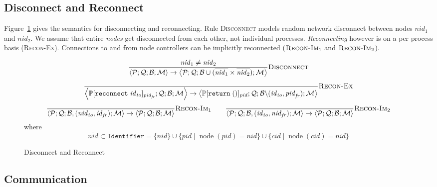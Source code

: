 \documentclass{article}
\newcommand{\sReturn}{\mathtt{return}}
\newcommand{\sReconnect}{\mathtt{reconnect}}
\DeclareMathOperator{\sNodeOf}{node}
\newcommand{\sNid}{\ensuremath{\mathit{nid}}}
\newcommand{\sPid}{\ensuremath{\mathit{pid}}}
\newcommand{\sCid}{\ensuremath{\mathit{cid}}}
\newcommand{\sId}{\ensuremath{\mathit{id}}}
\newcommand{\sSystem}[4]{\left\langle #1 ; #2 ; #3 ; #4 \right\rangle}
\newcommand{\sQueue}{\mathcal{Q}}
\newcommand{\sProcesses}{\mathcal{P}}
\newcommand{\sBlacklist}{\mathcal{B}}
\newcommand{\sMonitors}{\mathcal{M}}
\newcommand{\sCtxt}[1]{\mathbb{#1}}
\newcommand{\where}{\mathrel{|}}
\begin{document}
\subsection{Disconnect and Reconnect}

Figure~\ref{fig:disconnect} gives the semantics for disconnecting and
reconnecting.  Rule \textsc{Disconnect} models random network disconnect
between nodes $\sNid_1$ and $\sNid_2$.  We assume that entire \emph{nodes} get
disconnected from each other, not individual processes. \emph{Reconnecting}
however is on a per process basis (\textsc{Recon-Ex}).  Connections to and from
node controllers can be implicitly reconnected ($\textsc{Recon-Im}_1$ and
$\textsc{Recon-Im}_2$).

\begin{figure}
\small
\begin{equation*}
\frac{
  \sNid_1 \neq \sNid_2
}{
  \sSystem{\sProcesses}{\sQueue}{\sBlacklist}{\sMonitors}
\rightarrow
  \sSystem{\sProcesses}{\sQueue}{\sBlacklist \cup (\overline{\sNid_1} \times \overline{\sNid_2})}{\sMonitors}
} \textsc{Disconnect}
\end{equation*}
%
\begin{equation*}
\frac{
}{
  \sSystem{\sCtxt{P}[ \sReconnect \; \sId_\mathit{to} ]_{\sPid_\mathit{fr}}}
          {\sQueue}
          {\sBlacklist}
          {\sMonitors}
\rightarrow
  \sSystem{\sCtxt{P}[ \sReturn \; () ]_\sPid}
          {\sQueue}
          {\sBlacklist \backslash (\sId_\mathit{to}, \sPid_\mathit{fr})}
          {\sMonitors}
} \textsc{Recon-Ex}
\end{equation*}
%
\begin{equation*}
\frac{
}{
  \sSystem{\sProcesses}{\sQueue}{\sBlacklist, (\sNid_\mathit{to}, \sId_\mathit{fr})}{\sMonitors}
\rightarrow
  \sSystem{\sProcesses}{\sQueue}{\sBlacklist}{\sMonitors}
} \textsc{Recon-Im}_1
\qquad
\frac{
}{
  \sSystem{\sProcesses}{\sQueue}{\sBlacklist, (\sId_\mathit{to}, \sNid_\mathit{fr})}{\sMonitors}
\rightarrow
  \sSystem{\sProcesses}{\sQueue}{\sBlacklist}{\sMonitors}
} \textsc{Recon-Im}_2
\end{equation*}
%
where
%
\begin{equation*}
\overline{\sNid} \subset \mathtt{Identifier} 
  = \{ \sNid \} \cup 
    \{ \sPid \where \sNodeOf(\sPid) = \sNid \} \cup
    \{ \sCid \where \sNodeOf(\sCid) = \sNid \} 
\end{equation*}
\caption{\label{fig:disconnect}Disconnect and Reconnect}
\end{figure}

\subsection{Communication}
\end{document}
